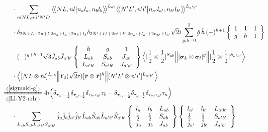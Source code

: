 \documentclass[master]{shnuthesis}
\newcommand{\llangle}{\big\langle\!\big\langle}
\newcommand{\rrangle}{\big\rangle\!\big\rangle}
\newcommand{\bmr}{\textbf{\textit{r}}}
\newcommand{\ap}{a^\prime}
\newcommand{\bp}{b^\prime}
\newcommand{\il}{\!\!\!\!\!\!\!\!\!\!}
\newcommand{\zdydh}{\xlongequal}
\begin{document}
\begin{align}
    & \cdot \sum_{nlNL,n^\prime l^\prime N^\prime L^\prime} \llangle N L, n l \big| n_{a} l_{a}, n_{b} l_{b} \rrangle^{L_{ab}} \llangle N^\prime L^\prime, n^\prime l^\prime \big| n_{a^\prime} l_{a^\prime}, n_{b^\prime} l_{b^\prime} \rrangle^{L_{\ap\bp}} \notag\\
    & \cdot \delta_{2N+L+2n+l,2n_a+l_a+2n_b+l_b}\delta_{2N^\prime+L^\prime+2n^\prime+l^\prime,2n_{a^\prime}+l_{a^\prime}+2n_{b^\prime}+l_{b^\prime}} \sqrt{2}i \sum_{g,h=0}^2 \hat{g}\,\hat{h}\, (-)^{h+1}  \left\{\begin{array}{ccc} 1 & 1 & 1 \\ g & h & 1 \end{array}\right\}   \notag\\
    & \cdot (-)^{g+h+1}\sqrt{3}\hat{J}_{ab}\hat{J}_{\ap\bp}  \left\{\begin{array}{ccc} h & g & 1 \\ L_{ab} & S_{ab} & J_{ab} \\ L_{\ap\bp} & S_{\ap\bp} & J_{\ap\bp} \end{array}\right\}  \Big\langle [\frac{1}{2}\otimes\frac{1}{2}]^{S_{ab}} \Big\| [\bm{\sigma}_k \otimes \bm{\sigma}_l]^g \Big\| [\frac{1}{2}\otimes\frac{1}{2}]^{S_{\ap\bp}} \Big\rangle \notag\\
    & \cdot \Big\langle [N L \otimes n l]^{L_{ab}} \Big\| Y_2(\sqrt{2}r) [\hat{\bmr} \otimes \hat{\bmr}]^h \Big\| [N^\prime L^\prime \otimes n^\prime l^\prime]^{L_{\ap\bp}} \Big\rangle \\
    &\il \zdydh[(\ref{Ll-Y2-rrh})]{(\ref{sigmakl-g})} 4i \Big( \delta_{\tau_a,-\frac{1}{2}}\delta_{\tau_{\ap},\frac{1}{2}}\delta_{\tau_b,\tau_{\bp}}\tau_b - \delta_{\tau_b,-\frac{1}{2}}\delta_{\tau_{\bp},\frac{1}{2}}\delta_{\tau_a,\tau_{\ap}}\tau_a \Big) \notag\\
    & \cdot \sum_{L_{ab}S_{ab}L_{\ap\bp}S_{\ap\bp}} \hat{j}_a\hat{j}_b\hat{j}_{\ap}\hat{j}_{\bp}\hat{L}_{ab}\hat{S}_{ab}\hat{L}_{\ap\bp}\hat{S}_{\ap\bp}  \left\{\begin{array}{lll}l_{a} & l_{b} & L_{ab} \\ \frac{1}{2} & \frac{1}{2} & S_{ab} \\j_{a} & j_{b} & J_{ab} \end{array}\right\} \left\{\begin{array}{lll}l_{\ap} & l_{\bp} & L_{\ap\bp} \\ \frac{1}{2} & \frac{1}{2} & S_{\ap\bp} \\j_{\ap} & j_{\bp} & J_{\ap\bp} \end{array}\right\}  \notag \\

\end{align}
\end{document}

